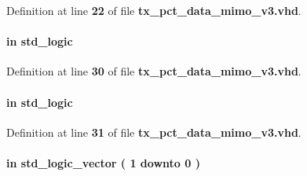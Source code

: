 Definition at line {\bf 22} of file {\bf tx\+\_\+pct\+\_\+data\+\_\+mimo\+\_\+v3.\+vhd}.

\paragraph[{reset\+\_\+n}]{ {\bfseries \textcolor{keywordflow}{in}\textcolor{vhdlchar}{ }} {\bfseries \textcolor{comment}{std\+\_\+logic}\textcolor{vhdlchar}{ }} \hspace{0.3cm}{\ttfamily [Port]}}\label{classtx__pct__data__mimo__v3_a446ea52ed8c4a84181a47d9165ce41a5}


Definition at line {\bf 30} of file {\bf tx\+\_\+pct\+\_\+data\+\_\+mimo\+\_\+v3.\+vhd}.

\paragraph[{reset\+\_\+n\+\_\+fifo\+\_\+wclk}]{ {\bfseries \textcolor{keywordflow}{in}\textcolor{vhdlchar}{ }} {\bfseries \textcolor{comment}{std\+\_\+logic}\textcolor{vhdlchar}{ }} \hspace{0.3cm}{\ttfamily [Port]}}\label{classtx__pct__data__mimo__v3_a74d1f077a46cde3ff4df07202adbd099}


Definition at line {\bf 31} of file {\bf tx\+\_\+pct\+\_\+data\+\_\+mimo\+\_\+v3.\+vhd}.

\paragraph[{sample\+\_\+width}]{ {\bfseries \textcolor{keywordflow}{in}\textcolor{vhdlchar}{ }} {\bfseries \textcolor{comment}{std\+\_\+logic\+\_\+vector}\textcolor{vhdlchar}{ }\textcolor{vhdlchar}{(}\textcolor{vhdlchar}{ }\textcolor{vhdlchar}{ } \textcolor{vhdldigit}{1} \textcolor{vhdlchar}{ }\textcolor{keywordflow}{downto}\textcolor{vhdlchar}{ }\textcolor{vhdlchar}{ } \textcolor{vhdldigit}{0} \textcolor{vhdlchar}{ }\textcolor{vhdlchar}{)}\textcolor{vhdlchar}{ }} \hspace{0.3cm}{\ttfamily [Port]}}\label{classtx__pct__data__mimo__v3_aa4357f9a7d7e21fa49f9ce61eec07e23}


